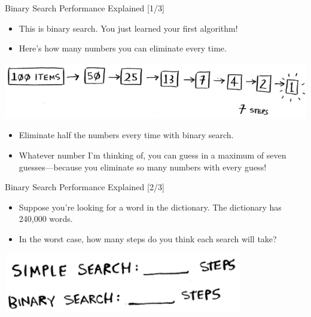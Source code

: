 \documentclass[ignorenonframetext,]{beamer}
\providecommand{\tightlist}{%
  \setlength{\itemsep}{0pt}\setlength{\parskip}{0pt}}
\begin{document}
\begin{frame}{Binary Search Performance Explained {[}1/3{]}}
\protect\hypertarget{binary-search-performance-explained-13}{}

\begin{itemize}
\tightlist
\item
  This is binary search. You just learned your first algorithm!
\item
  Here's how many numbers you can eliminate every time.
\end{itemize}

\includegraphics{./Chapter01-figure/search_steps_01.png}

\begin{itemize}
\tightlist
\item
  Eliminate half the numbers every time with binary search.
\item
  Whatever number I'm thinking of, you can guess in a maximum of seven
  guesses---because you eliminate so many numbers with every guess!
\end{itemize}

\end{frame}

\begin{frame}{Binary Search Performance Explained {[}2/3{]}}
\protect\hypertarget{binary-search-performance-explained-23}{}

\begin{itemize}
\tightlist
\item
  Suppose you're looking for a word in the dictionary. The dictionary
  has 240,000 words.
\item
  In the worst case, how many steps do you think each search will take?
\end{itemize}

\includegraphics{./Chapter01-figure/search_steps_02.png}

\end{frame}
\end{document}
